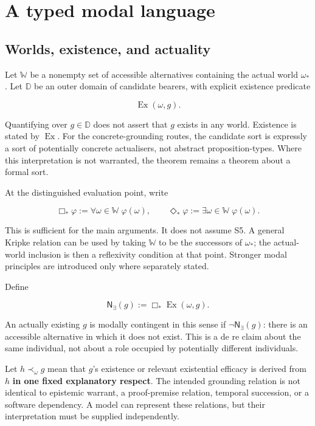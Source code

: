 \documentclass[11pt,a4paper]{article}
\begin{document}
\section{A typed modal language}\label{a-typed-modal-language}

\subsection{Worlds, existence, and
actuality}\label{worlds-existence-and-actuality}

Let \(\mathbb W\) be a nonempty set of accessible alternatives
containing the actual world \(\omega_*\). Let \(\mathbb D\) be an outer
domain of candidate bearers, with explicit existence predicate

\nopagebreak[4]

\[
\operatorname{Ex}(\omega,g).
\]

Quantifying over \(g\in\mathbb D\) does not assert that \(g\) exists in
any world. Existence is stated by \(\operatorname{Ex}\). For the
concrete-grounding routes, the candidate sort is expressly a sort of
potentially concrete actualisers, not abstract proposition-types. Where
this interpretation is not warranted, the theorem remains a theorem
about a formal sort.

At the distinguished evaluation point, write

\nopagebreak[4]

\[
\Box_*\varphi:=\forall\omega\in\mathbb W\;\varphi(\omega),
\qquad
\Diamond_*\varphi:=\exists\omega\in\mathbb W\;\varphi(\omega).
\]

This is sufficient for the main arguments. It does not assume S5. A
general Kripke relation can be used by taking \(\mathbb W\) to be the
successors of \(\omega_*\); the actual-world inclusion is then a
reflexivity condition at that point. Stronger modal principles are
introduced only where separately stated.

Define

\nopagebreak[4]

\[
\mathsf N_{\exists}(g):=\Box_*\operatorname{Ex}(\omega,g).
\]

An actually existing \(g\) is modally contingent in this sense if
\(\neg\mathsf N_{\exists}(g)\): there is an accessible alternative in
which it does not exist. This is a de re claim about the same
individual, not about a role occupied by potentially different
individuals.

Let \(h\prec_\omega g\) mean that \(g\)'s existence or relevant
existential efficacy is derived from \(h\) \textbf{in one fixed
explanatory respect}. The intended grounding relation is not identical
to epistemic warrant, a proof-premise relation, temporal succession, or
a software dependency. A model can represent these relations, but their
interpretation must be supplied independently.
\end{document}
